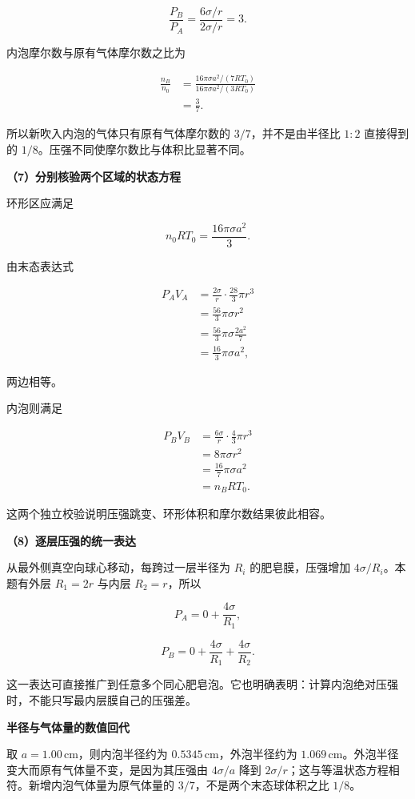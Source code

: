 \documentclass[12pt,a4paper,UTF8]{ctexart}
\begin{document}
\[
\frac{P_B}{P_A}
=\frac{6\sigma/r}{2\sigma/r}
=3.
\tag{19}
\]

内泡摩尔数与原有气体摩尔数之比为

\[
\begin{aligned}
\frac{n_B}{n_0}
&=\frac{16\pi\sigma a^2/(7RT_0)}
{16\pi\sigma a^2/(3RT_0)}\\
&=\frac37.
\end{aligned}
\tag{20}
\]

所以新吹入内泡的气体只有原有气体摩尔数的 \(3/7\)，并不是由半径比 \(1:2\)
直接得到的 \(1/8\)。压强不同使摩尔数比与体积比显著不同。

\textbf{（7）分别核验两个区域的状态方程}

环形区应满足

\[
n_0RT_0
=\frac{16\pi\sigma a^2}{3}.
\]

由末态表达式

\[
\begin{aligned}
P_AV_A
&=\frac{2\sigma}{r}\cdot\frac{28}{3}\pi r^3\\
&=\frac{56}{3}\pi\sigma r^2\\
&=\frac{56}{3}\pi\sigma\frac{2a^2}{7}\\
&=\frac{16}{3}\pi\sigma a^2,
\end{aligned}
\]

两边相等。

内泡则满足

\[
\begin{aligned}
P_BV_B
&=\frac{6\sigma}{r}\cdot\frac43\pi r^3\\
&=8\pi\sigma r^2\\
&=\frac{16}{7}\pi\sigma a^2\\
&=n_BRT_0.
\end{aligned}
\tag{21}
\]

这两个独立校验说明压强跳变、环形体积和摩尔数结果彼此相容。

\textbf{（8）逐层压强的统一表达}

从最外侧真空向球心移动，每跨过一层半径为 \(R_i\) 的肥皂膜，压强增加
\(4\sigma/R_i\)。本题有外层 \(R_1=2r\) 与内层 \(R_2=r\)，所以

\[
P_A=0+\frac{4\sigma}{R_1},
\]

\[
P_B=0+\frac{4\sigma}{R_1}+\frac{4\sigma}{R_2}.
\tag{22}
\]

这一表达可直接推广到任意多个同心肥皂泡。它也明确表明：计算内泡绝对压强时，不能只写最内层膜自己的压强差。

\textbf{半径与气体量的数值回代}

取 \(a=1.00\,\mathrm{cm}\)，则内泡半径约为
\(0.5345\,\mathrm{cm}\)，外泡半径约为
\(1.069\,\mathrm{cm}\)。外泡半径变大而原有气体量不变，是因为其压强由
\(4\sigma/a\) 降到
\(2\sigma/r\)；这与等温状态方程相符。新增内泡气体量为原气体量的
\(3/7\)，不是两个末态球体积之比 \(1/8\)。
\end{document}
